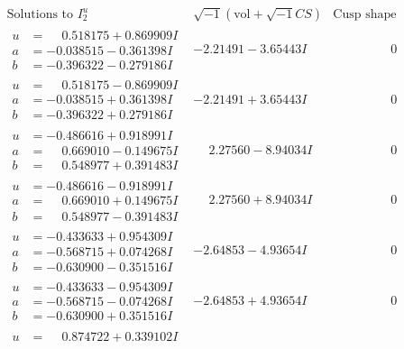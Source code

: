 \documentclass[1p]{elsarticle_modified}
\theoremstyle{definition}
\newcommand{\I}{\sqrt{-1}}
\begin{document}
$$\begin{array}{c|c|c}  
\text{Solutions to }I^u_{2}& \I (\text{vol} + \sqrt{-1}CS) & \text{Cusp shape}\\
 \hline 
\begin{aligned}
u &= \phantom{-}0.518175 + 0.869909 I \\
a &= -0.038515 - 0.361398 I \\
b &= -0.396322 - 0.279186 I\end{aligned}
 & -2.21491 - 3.65443 I & \phantom{-0.000000 } 0 \\ \hline\begin{aligned}
u &= \phantom{-}0.518175 - 0.869909 I \\
a &= -0.038515 + 0.361398 I \\
b &= -0.396322 + 0.279186 I\end{aligned}
 & -2.21491 + 3.65443 I & \phantom{-0.000000 } 0 \\ \hline\begin{aligned}
u &= -0.486616 + 0.918991 I \\
a &= \phantom{-}0.669010 - 0.149675 I \\
b &= \phantom{-}0.548977 + 0.391483 I\end{aligned}
 & \phantom{-}2.27560 - 8.94034 I & \phantom{-0.000000 } 0 \\ \hline\begin{aligned}
u &= -0.486616 - 0.918991 I \\
a &= \phantom{-}0.669010 + 0.149675 I \\
b &= \phantom{-}0.548977 - 0.391483 I\end{aligned}
 & \phantom{-}2.27560 + 8.94034 I & \phantom{-0.000000 } 0 \\ \hline\begin{aligned}
u &= -0.433633 + 0.954309 I \\
a &= -0.568715 + 0.074268 I \\
b &= -0.630900 - 0.351516 I\end{aligned}
 & -2.64853 - 4.93654 I & \phantom{-0.000000 } 0 \\ \hline\begin{aligned}
u &= -0.433633 - 0.954309 I \\
a &= -0.568715 - 0.074268 I \\
b &= -0.630900 + 0.351516 I\end{aligned}
 & -2.64853 + 4.93654 I & \phantom{-0.000000 } 0 \\ \hline\begin{aligned}
u &= \phantom{-}0.874722 + 0.339102 I \\

\end{aligned}
\end{array}$$
\end{document}
